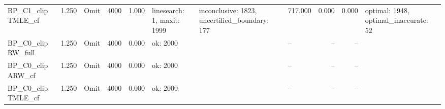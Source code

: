 \begin{tabular}{llllrlllrrl}
BP\_C1\_clip TMLE\_cf & 1.250 & Omit & 4000 & 1.000 & linesearch: 1, maxit: 1999 & inconclusive: 1823, uncertified\_boundary: 177 & 717.000 & 0.000 & 0.000 & optimal: 1948, optimal\_inaccurate: 52 \\
BP\_C0\_clip RW\_full & 1.250 & Omit & 4000 & 0.000 & ok: 2000 &  & -- & -- & -- &  \\
BP\_C0\_clip ARW\_cf & 1.250 & Omit & 4000 & 0.000 & ok: 2000 &  & -- & -- & -- &  \\
BP\_C0\_clip TMLE\_cf & 1.250 & Omit & 4000 & 0.000 & ok: 2000 &  & -- & -- & -- &  \\
\hline
\end{tabular}
